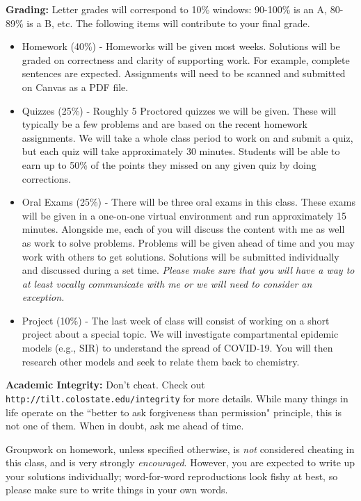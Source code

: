\documentclass[12pt]{amsbook}
\begin{document}
\textbf{Grading:} Letter grades will correspond to 10\% windows: 90-100\% is an A, 80-89\% is a B, etc. The following items will contribute to your final grade.
\begin{itemize}
\item Homework (40\%) - Homeworks will be given most weeks. Solutions will be graded on correctness and clarity of supporting work. For example, complete sentences are expected. Assignments will need to be scanned and submitted on Canvas as a PDF file.
\item Quizzes (25\%) -  Roughly 5 Proctored quizzes we will be given.  These will typically be a few problems and are based on the recent homework assignments. We will take a whole class period to work on and submit a quiz, but each quiz will take approximately 30 minutes. Students will be able to earn up to 50\% of the points they missed on any given quiz by doing corrections.
\item Oral Exams (25\%) - There will be three oral exams in this class. These exams will be given in a one-on-one virtual environment and run approximately 15 minutes.  Alongside me, each of you will discuss the content with me as well as work to solve problems. Problems will be given ahead of time and you may work with others to get solutions.  Solutions will be submitted individually and discussed during a set time. \emph{Please make sure that you will have a way to at least vocally communicate with me or we will need to consider an exception.}
\item Project (10\%) - The last week of class will consist of working on a short project about a special topic.  We will investigate compartmental epidemic models (e.g., SIR) to understand the spread of COVID-19.  You will then research other models and seek to relate them back to chemistry. 
\end{itemize}

\textbf{Academic Integrity:} Don't cheat. Check out \texttt{http://tilt.colostate.edu/integrity} for more details. While many things in life operate on the ``better to ask forgiveness than permission" principle, this is not one of them. When in doubt, ask me ahead of time.

Groupwork on homework, unless specified otherwise, is \emph{not} considered cheating in this class, and is very strongly \emph{encouraged}. However, you are expected to write up your solutions individually; word-for-word reproductions look fishy at best, so please make sure to write things in your own words.
\end{document}
